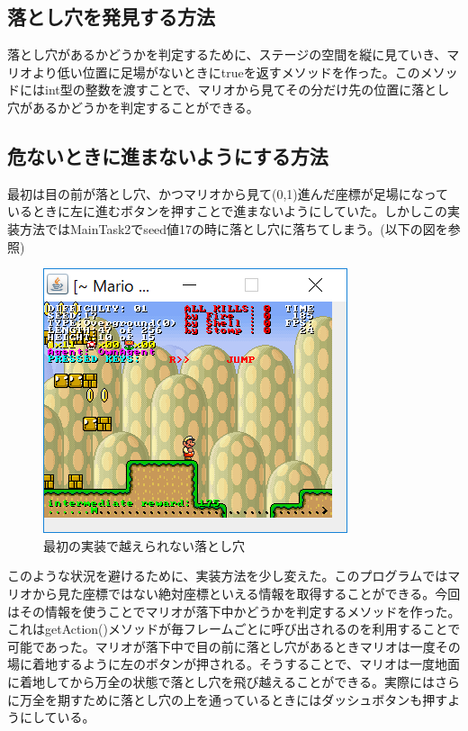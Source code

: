 \documentclass{jsarticle}
\begin{document}
\subsection{落とし穴を発見する方法}
落とし穴があるかどうかを判定するために、ステージの空間を縦に見ていき、マリオより低い位置に足場がないときにtrueを返すメソッドを作った。このメソッドにはint型の整数を渡すことで、マリオから見てその分だけ先の位置に落とし穴があるかどうかを判定することができる。
\subsection{危ないときに進まないようにする方法}
最初は目の前が落とし穴、かつマリオから見て(0,1)進んだ座標が足場になっているときに左に進むボタンを押すことで進まないようにしていた。しかしこの実装方法ではMainTask2でseed値17の時に落とし穴に落ちてしまう。(以下の図を参照)

\begin{figure}[H]
	\includegraphics{falling_hole}
	\caption{最初の実装で越えられない落とし穴}
\end{figure}

このような状況を避けるために、実装方法を少し変えた。このプログラムではマリオから見た座標ではない絶対座標といえる情報を取得することができる。今回はその情報を使うことでマリオが落下中かどうかを判定するメソッドを作った。これはgetAction()メソッドが毎フレームごとに呼び出されるのを利用することで可能であった。マリオが落下中で目の前に落とし穴があるときマリオは一度その場に着地するように左のボタンが押される。そうすることで、マリオは一度地面に着地してから万全の状態で落とし穴を飛び越えることができる。実際にはさらに万全を期すために落とし穴の上を通っているときにはダッシュボタンも押すようにしている。
\newpage
\end{document}
